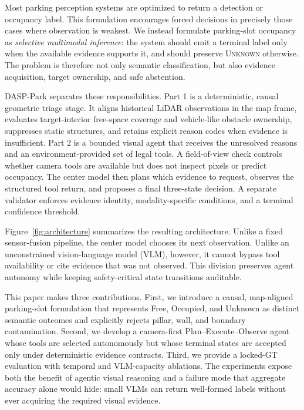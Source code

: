 \documentclass[conference]{IEEEtran}
\begin{document}
Most parking perception systems are optimized to return a detection or occupancy label. This formulation encourages forced decisions in precisely those cases where observation is weakest. We instead formulate parking-slot occupancy as \emph{selective multimodal inference}: the system should emit a terminal label only when the available evidence supports it, and should preserve \textsc{Unknown} otherwise. The problem is therefore not only semantic classification, but also evidence acquisition, target ownership, and safe abstention.

DASP-Park separates these responsibilities. Part 1 is a deterministic, causal geometric triage stage. It aligns historical LiDAR observations in the map frame, evaluates target-interior free-space coverage and vehicle-like obstacle ownership, suppresses static structures, and retains explicit reason codes when evidence is insufficient. Part 2 is a bounded visual agent that receives the unresolved reasons and an environment-provided set of legal tools. A field-of-view check controls whether camera tools are available but does not inspect pixels or predict occupancy. The center model then plans which evidence to request, observes the structured tool return, and proposes a final three-state decision. A separate validator enforces evidence identity, modality-specific conditions, and a terminal confidence threshold.

Figure~\ref{fig:architecture} summarizes the resulting architecture. Unlike a fixed sensor-fusion pipeline, the center model chooses its next observation. Unlike an unconstrained vision-language model (VLM), however, it cannot bypass tool availability or cite evidence that was not observed. This division preserves agent autonomy while keeping safety-critical state transitions auditable.

This paper makes three contributions. First, we introduce a causal, map-aligned parking-slot formulation that represents Free, Occupied, and Unknown as distinct semantic outcomes and explicitly rejects pillar, wall, and boundary contamination. Second, we develop a camera-first Plan--Execute--Observe agent whose tools are selected autonomously but whose terminal states are accepted only under deterministic evidence contracts. Third, we provide a locked-GT evaluation with temporal and VLM-capacity ablations. The experiments expose both the benefit of agentic visual reasoning and a failure mode that aggregate accuracy alone would hide: small VLMs can return well-formed labels without ever acquiring the required visual evidence.
\end{document}
